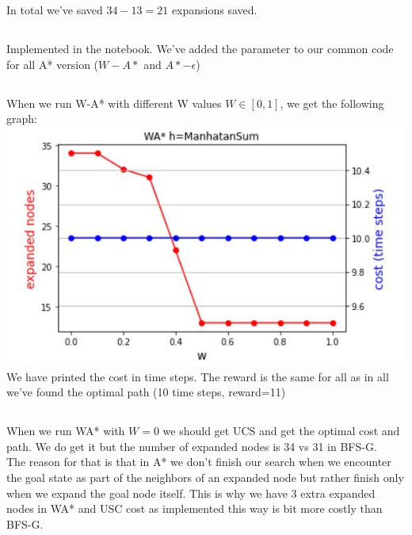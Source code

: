 \documentclass[12pt]{article}
\begin{document}
In total we've saved $34-13=21$ expansions saved.

\subsection{}
Implemented in the notebook. We've added the parameter to our common code for all A* version ($W-A*$ and $A*-\epsilon$)

\subsection{}

When we run W-A* with different W values $W\in[0,1]$, we get the following graph:\\
\includegraphics[scale=1]{w_graph.JPG}\\

We have printed the cost in time steps. The reward is the same for all as in all we've found the optimal path (10 time steps, reward=11)

\subsection{}

When we run WA* with $W=0$ we should get UCS and get the optimal cost and path. We do get it but the number of expanded nodes is 34 vs 31 in BFS-G.\\

The reason for that is that in A* we don't finish our search when we encounter the goal state as part of the neighbors of an expanded node but rather finish only when we expand the goal node itself. This is why we have 3 extra expanded nodes in WA* and USC cost as implemented this way is bit more costly than BFS-G.\\
\end{document}
